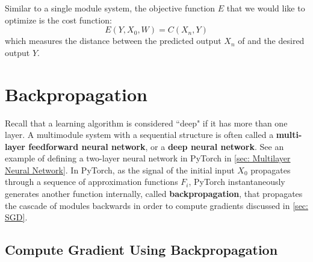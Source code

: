 Similar to a single module system, the objective function $E$ that we would like to optimize is the cost function:
\[
E(Y, X_0, W) = C(X_n, Y)
\]
which measures the distance between the predicted output $X_n$ of and the desired output $Y$. 
\section{Backpropagation}\label{sec: Backpropagation}

Recall that a learning algorithm is considered ``deep" if it has more than one layer.
A multimodule system with a sequential structure is often called a \textbf{multi-layer feedforward neural network}, or a \textbf{deep neural network}.
See an example of defining a two-layer neural network in PyTorch in \cref{sec: Multilayer Neural Network}.
In PyTorch, as the signal of the initial input $X_0$ propagates through a sequence of approximation functions $F_i$, PyTorch instantaneously generates another function internally, called \textbf{backpropagation}, that propagates the cascade of modules backwards in order to compute gradients discussed in \cref{sec: SGD}. 

\subsection{Compute Gradient Using Backpropagation}\label{ssc: Compute SGD using backprop}

